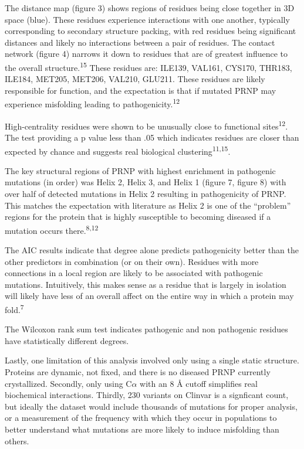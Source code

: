 \documentclass[
  twocolumn]{biophys-new-mod}
\begin{document}
The distance map (figure 3) shows regions of residues being close
together in 3D space (blue). These residues experience interactions with
one another, typically corresponding to secondary structure packing,
with red residues being significant distances and likely no interactions
between a pair of residues. The contact network (figure 4) narrows it
down to residues that are of greatest influence to the overall
structure.\textsuperscript{15} These residues are: ILE139, VAL161,
CYS170, THR183, ILE184, MET205, MET206, VAL210, GLU211. These residues
are likely responsible for function, and the expectation is that if
mutated PRNP may experience misfolding leading to
pathogenicity.\textsuperscript{12}

High-centrality residues were shown to be unusually close to functional
sites\textsuperscript{12}. The test providing a p value less than .05
which indicates residues are closer than expected by chance and suggests
real biological clustering\textsuperscript{11,15}.

The key structural regions of PRNP with highest enrichment in pathogenic
mutations (in order) was Helix 2, Helix 3, and Helix 1 (figure 7, figure
8) with over half of detected mutations in Helix 2 resulting in
pathogenicity of PRNP. This matches the expectation with literature as
Helix 2 is one of the ``problem'' regions for the protein that is highly
susceptible to becoming diseased if a mutation occurs
there.\textsuperscript{8,12}

The AIC results indicate that degree alone predicts pathogenicity better
than the other predictors in combination (or on their own). Residues
with more connections in a local region are likely to be associated with
pathogenic mutations. Intuitively, this makes sense as a residue that is
largely in isolation will likely have less of an overall affect on the
entire way in which a protein may fold.\textsuperscript{7}

The Wilcoxon rank sum test indicates pathogenic and non pathogenic
residues have statistically different degrees.

Lastly, one limitation of this analysis involved only using a single
static structure. Proteins are dynamic, not fixed, and there is no
diseased PRNP currently crystallized. Secondly, only using C\(\alpha\)
with an 8 Å cutoff simplifies real biochemical interactions. Thirdly,
230 variants on Clinvar is a signficant count, but ideally the dataset
would include thousands of mutations for proper analysis, or a
measurement of the frequency with which they occur in populations to
better understand what mutations are more likely to induce misfolding
than others.
\end{document}
